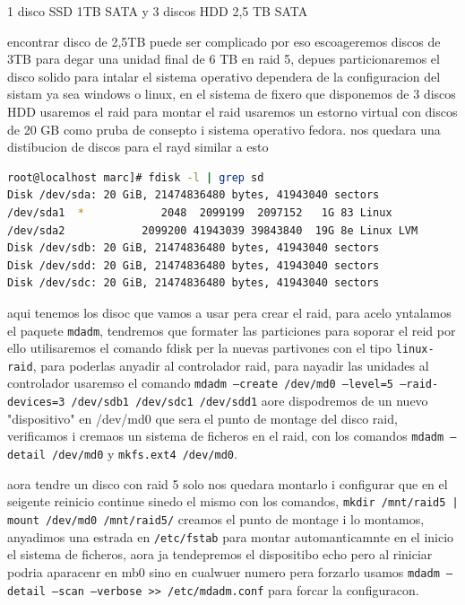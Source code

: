 \documentclass[preprint,11pt]{elsarticle}
\begin{document}
1 disco SSD 1TB SATA  y 3 discos  HDD 2,5 TB SATA\smallskip

encontrar disco de 2,5TB puede ser complicado por eso escoageremos discos de 3TB para degar una unidad final de 6 TB en raid 5, depues particionaremos el disco solido para intalar el sistema operativo dependera de la configuracion del sistam ya sea windows o linux, en el sistema de fixero que disponemos de 3 discos HDD usaremos el raid para montar el raid usaremos un estorno virtual con discos de 20 GB como pruba de consepto i sistema operativo fedora. nos quedara una distibucion de discos para el rayd similar a esto 

\begin{lstlisting}[basicstyle=\tiny, language=bash]
root@localhost marc]# fdisk -l | grep sd
Disk /dev/sda: 20 GiB, 21474836480 bytes, 41943040 sectors
/dev/sda1  *            2048  2099199  2097152   1G 83 Linux
/dev/sda2            2099200 41943039 39843840  19G 8e Linux LVM
Disk /dev/sdb: 20 GiB, 21474836480 bytes, 41943040 sectors
Disk /dev/sdd: 20 GiB, 21474836480 bytes, 41943040 sectors
Disk /dev/sdc: 20 GiB, 21474836480 bytes, 41943040 sectors

\end{lstlisting}

aqui tenemos los disoc que vamos a usar pera crear el raid, para acelo yntalamos el paquete \texttt{mdadm}, tendremos que formater las particiones para soporar el reid por ello utilisaremos el comando fdisk per la nuevas partivones con el tipo \texttt{linux-raid}, para poderlas anyadir al controlador raid, para nayadir las unidades al controlador usaremso el comando \texttt{mdadm --create /dev/md0 --level=5 --raid-devices=3 /dev/sdb1 /dev/sdc1 /dev/sdd1}  aore dispodremos de un nuevo "dispositivo" en /dev/md0 que sera el punto de montage del disco raid, verificamos i  cremaos un sistema de ficheros en el raid, con los comandos \texttt{mdadm --detail /dev/md0} y \texttt{mkfs.ext4 /dev/md0}.\smallskip

aora tendre un disco con raid 5 solo nos quedara montarlo i configurar que en el seigente reinicio continue sinedo el mismo con los comandos, \texttt{mkdir /mnt/raid5 | mount /dev/md0 /mnt/raid5/} creamos el punto de montage i lo montamos,  anyadimos una estrada en \texttt{/etc/fstab} para montar automanticamnte en el inicio el sistema de ficheros, aora ja tendepremos el dispositibo echo pero al riniciar podria aparacenr en mb0 sino en cualwuer numero pera forzarlo usamos \texttt{mdadm --detail --scan --verbose >> /etc/mdadm.conf} para forcar la configuracon.\smallskip
\end{document}
